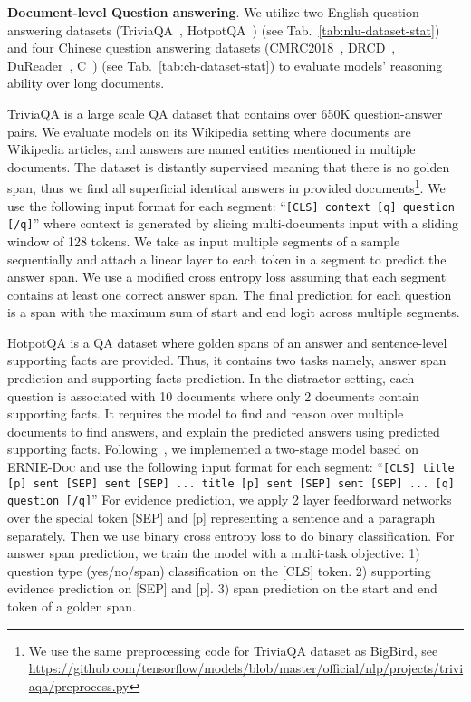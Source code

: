 \documentclass[11pt,a4paper]{article}
\newcommand{\mname}{\textsc{ERNIE-Doc}\xspace}
\begin{document}
\noindent \textbf{Document-level Question answering}. We utilize two English question answering datasets (TriviaQA~\citep{joshi2017triviaqa}, HotpotQA~\citep{yang2018hotpotqa}) (see Tab.~\ref{tab:nlu-dataset-stat}) and four Chinese question answering datasets (CMRC2018~\citep{cmrc2018}, DRCD~\citep{drcd}, DuReader~\citep{dureader}, C~\citep{c3}) (see Tab.~\ref{tab:ch-dataset-stat}) to evaluate models' reasoning ability over long documents. 

TriviaQA is a large scale QA dataset that contains over 650K question-answer pairs. We evaluate models on its Wikipedia setting where documents are Wikipedia articles, and answers are named entities mentioned in multiple documents. The dataset is distantly supervised meaning that there is no golden span, thus we find all superficial identical answers in provided documents\footnote{We use the same preprocessing code for TriviaQA dataset as BigBird, see \url{https://github.com/tensorflow/models/blob/master/official/nlp/projects/triviaqa/preprocess.py}}. We use the following input format for each segment: ``\texttt{[CLS] context [q] question [/q]}'' where context is generated by slicing multi-documents input with a sliding window of 128 tokens. We take as input multiple segments of a sample sequentially and attach a linear layer to each token in a segment to predict the answer span. We use a modified cross entropy loss \citep{clark2017simple} assuming that each segment contains at least one correct answer span. The final prediction for each question is a span with the maximum sum of start and end logit across multiple segments. 

HotpotQA is a QA dataset where golden spans of an answer and sentence-level supporting facts are provided. Thus, it contains two tasks namely, answer span prediction and supporting facts prediction. In the distractor setting, each question is associated with 10 documents where only 2 documents contain supporting facts. It requires the model to find and reason over multiple documents to find answers, and explain the predicted answers using predicted supporting facts. Following~\citet{groeneveld2020simple}, we implemented a two-stage model based on \mname and use the following input format for each segment: ``\texttt{[CLS] title [p] sent [SEP] sent [SEP] ... title [p] sent [SEP] sent [SEP] ... [q] question [/q]}'' For evidence prediction, we apply 2 layer feedforward networks over the special token [SEP] and [p] representing a sentence and a paragraph separately. Then we use binary cross entropy loss to do binary classification. For answer span prediction, we train the model with a multi-task objective: 1) question type (yes/no/span) classification on the [CLS] token. 2) supporting evidence prediction on [SEP] and [p]. 3) span prediction on the start and end token of a golden span.
\end{document}
